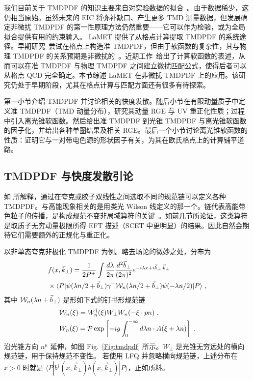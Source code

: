 我们目前关于 TMDPDF 的知识主要来自对实验数据的拟合~\cite{Landry:1999an,Konychev:2005iy,Su:2014wpa,Echevarria:2014xaa,Kang:2015msa,Bacchetta:2017gcc,Scimemi:2017etj,Bertone:2019nxa,Scimemi:2019cmh,Bacchetta:2019sam}。由于数据稀少，这仍相当原始。虽然未来的 EIC 将弥补缺口、产生更多 TMD 测量数据，但发展确定非微扰 TMDPDF 的第一性原理方法仍然重要——它可以作为检验，或为全局拟合提供有用的约束输入。
LaMET 提供了从格点计算提取 TMDPDF 的系统途径。早期研究~\cite{Ji:2014hxa,Ji:2018hvs,Ebert:2018gzl,Ebert:2019okf}尝试在格点上构造准 TMDPDF，但由于软函数的复杂性，其与物理 TMDPDF 的关系预期是非微扰的~\cite{Ebert:2019okf}。近期工作~\cite{Ji:2019sxk,Ji:2019ewn}给出了计算软函数的表述，从而可以在准 TMDPDF 与物理 TMDPDF 之间建立微扰匹配公式，使得后者可以从格点 QCD 完全确定。本节综述 LaMET 在非微扰 TMDPDF 上的应用。该研究仍处于早期阶段，尤其在格点计算与匹配方面还有很多有待探索。

第一小节介绍 TMDPDF 并讨论相关的快度发散。随后小节在有限动量质子中定义准 TMDPDF（TMD 动量分布），研究其动量 RGE 与 UV 重正化性质；过程中引入离光锥软函数。然后给出准 TMDPDF 到光锥 TMDPDF 与离光锥软函数的因子化，并给出各种单圈结果及相关 RGE。最后一个小节讨论离光锥软函数的性质：证明它与一对带电色源的形状因子有关，为其在欧氏格点上的计算铺平道路。

\subsection{TMDPDF 与快度发散引论}
\label{sec:lightconetmd}

如  所解释，通过在夸克或胶子双线性之间选取不同的规范链可以定义各种 TMDPDF。与高能现象相关的是用类光 Wilson 线定义的那一个。链代表高能带色粒子的传播，是构成规范不变非局域算符的关键~\cite{Belitsky:2002sm}。如前几节所论证，这类算符是取质子无穷动量极限所得 EFT 描述（SCET 中更明显）的结果。因此自然会期待它们需要额外的正规化与重正化。

以非单态夸克非极化 TMDPDF 为例。略去场论的微妙之处，分布为
\begin{align}\label{eq:beam}
	& f(x,\vec{k}_\perp) = \frac{1}{2P^+}\int\frac{d\lambda}{2\pi}\frac{d^2\vec{b}_\perp}{(2\pi)^2}
	e^{-i\lambda x+i\vec{k}_\perp \cdot \vec{b}_\perp}\\
	& \times \langle P| \bar \psi(\lambda n/2 +\vec{b}_\perp)\gamma^+{\cal W}_n(\lambda n/2+\vec{b}_\perp)\psi(-\lambda n/2)|P\rangle  \ ,\nonumber
\end{align}
其中 ${\cal W}_n(\lambda n+\vec{b}_\perp)$ 是形如下式的钉书形规范链
\begin{align}
	&{\cal W}_n(\xi)=W^{\dagger}_{n}(\xi)W_{\perp}W_{n}(-\xi \cdot p n) \label{eq:staplen} \ , \\
	&W_{n}(\xi)= {\cal P}\exp\left[-ig\int_{0}^{-\infty} d\lambda n\cdot A(\xi+\lambda n)\right] \ ,
\end{align}
沿光锥方向 $n^\mu$ 延伸，如图 Fig.~\ref{Fig:tmdpdf} 所示。$W_\perp$ 是光锥无穷远处的横向规范链，用于保持规范不变性。
若使用 LFQ 并忽略横向规范链，上述分布在 $x>0$ 时就是 $\langle P|b^\dagger (x,\vec{k}_\perp)b(x,\vec{k}_\perp)|P\rangle$，正如所料。


